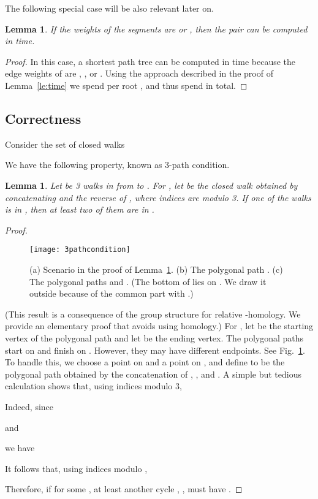 \documentclass[11pt,a4paper]{article}
\newtheorem{lemma}[definition]{Lemma}
\begin{document}
The following special case will be also relevant later on.
\begin{lemma}\label{le:time2}
	If the weights of the segments  are  or , 
	then the pair  can be computed in  time.
\end{lemma}
\begin{proof}
	In this case, a shortest path tree  can be computed 
	in  time
	because the edge weights of  are , , or .
	Using the approach described in the proof of Lemma~\ref{le:time} we spend  per root ,
	and thus spend  in total.
\end{proof}

\subsection{Correctness}

Consider the set of closed walks
 
We have the following property, known as 3-path condition.

\begin{lemma}\label{le:3-path}
	Let  be 3 walks in  from  to . For ,
	let  be the closed walk obtained by concatenating  and the reverse of ,
	where indices are modulo 3.
	If one of the walks  is in , then at least two of them are in .
\end{lemma}
\begin{proof}
	\begin{figure}
	\centering
		\texttt{[image: 3pathcondition]}
		\caption{(a) Scenario in the proof of Lemma~\ref{le:3-path}.
			(b) The polygonal path .
            (c) The polygonal paths  and . (The bottom of  lies on . We draw it outside because of the common part with .)}
	\label{fig:3pathcondition}
	\end{figure}
	(This result is a consequence of the group structure for relative -homology. 
	We provide an elementary proof that avoids using homology.)
	For , let  be the starting vertex of the polygonal path 
	and let  be the ending vertex.
	The polygonal paths  
	start on  and finish on .
	However, they may have different endpoints.
	See Fig.~\ref{fig:3pathcondition}.
	To handle this, we choose a point  on  and a point  on ,
	and define  to be the polygonal path obtained
	by the concatenation of , , and . 
A simple but tedious calculation shows that, using indices modulo 3,
	
	Indeed, since
	
	and 
	
	we have 
	
	It follows that, using indices modulo ,
	
	Therefore, if  for some , at least another cycle , ,
	must have .\qedhere
\end{proof}
\end{document}
